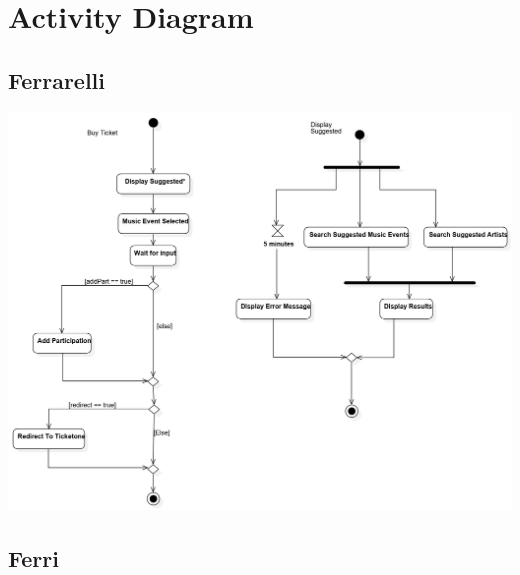 \documentclass[11pt,a4paper]{article}
\begin{document}
\section{Activity Diagram}
\subsection{Ferrarelli}
\includegraphics[scale=0.4]{ADFerrarelli.jpg}
\subsection{Ferri}
\end{document}
